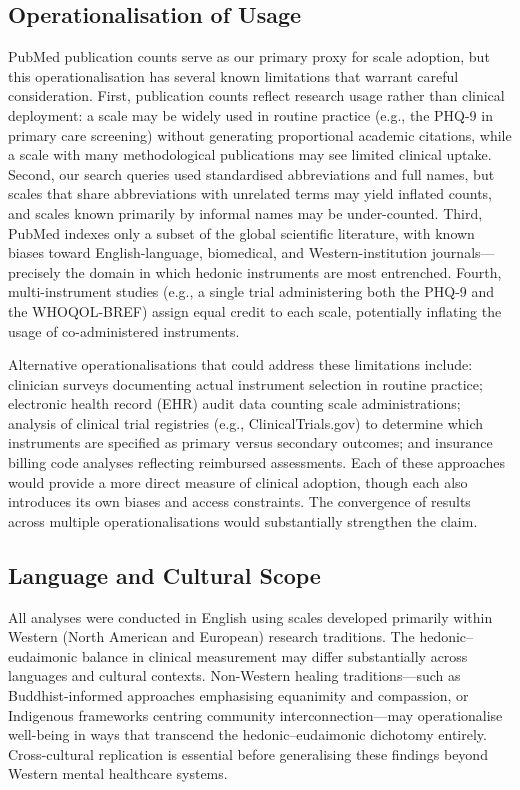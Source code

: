 \documentclass[12pt,a4paper]{article}
\begin{document}
\subsection{Operationalisation of Usage}

PubMed publication counts serve as our primary proxy for scale adoption, but this operationalisation has several known limitations that warrant careful consideration.
First, publication counts reflect research usage rather than clinical deployment: a scale may be widely used in routine practice (e.g., the PHQ-9 in primary care screening) without generating proportional academic citations, while a scale with many methodological publications may see limited clinical uptake.
Second, our search queries used standardised abbreviations and full names, but scales that share abbreviations with unrelated terms may yield inflated counts, and scales known primarily by informal names may be under-counted.
Third, PubMed indexes only a subset of the global scientific literature, with known biases toward English-language, biomedical, and Western-institution journals---precisely the domain in which hedonic instruments are most entrenched.
Fourth, multi-instrument studies (e.g., a single trial administering both the PHQ-9 and the WHOQOL-BREF) assign equal credit to each scale, potentially inflating the usage of co-administered instruments.

Alternative operationalisations that could address these limitations include: clinician surveys documenting actual instrument selection in routine practice; electronic health record (EHR) audit data counting scale administrations; analysis of clinical trial registries (e.g., ClinicalTrials.gov) to determine which instruments are specified as primary versus secondary outcomes; and insurance billing code analyses reflecting reimbursed assessments.
Each of these approaches would provide a more direct measure of clinical adoption, though each also introduces its own biases and access constraints.
The convergence of results across multiple operationalisations would substantially strengthen the claim.

\subsection{Language and Cultural Scope}

All analyses were conducted in English using scales developed primarily within Western (North American and European) research traditions.
The hedonic--eudaimonic balance in clinical measurement may differ substantially across languages and cultural contexts.
Non-Western healing traditions---such as Buddhist-informed approaches emphasising equanimity and compassion, or Indigenous frameworks centring community interconnection---may operationalise well-being in ways that transcend the hedonic--eudaimonic dichotomy entirely.
Cross-cultural replication is essential before generalising these findings beyond Western mental healthcare systems.
\end{document}
